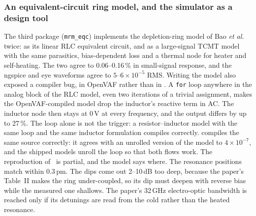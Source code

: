 \subsubsection{An equivalent-circuit ring model, and the simulator as a design tool}
The third package (\texttt{mrm\_eqc}) implements the depletion-ring model of Bao
\emph{et al.}~\cite{bao2024mrm} twice: as its linear RLC equivalent circuit, and as a
large-signal TCMT model with the same parasitics, bias-dependent loss and a thermal node for
heater and self-heating. The two agree to 0.06--0.16\,\% in small-signal response, and the
ngspice and \vas{} eye waveforms agree to $5$--$6\times10^{-5}$ RMS.
Writing the model also exposed a compiler bug, in OpenVAF rather than in \vas{}. A \texttt{for}
loop anywhere in the analog block of the RLC model, even two iterations of a trivial
assignment, makes the OpenVAF-compiled model drop the inductor's reactive term in AC. The
inductor node then stays at 0\,V at every frequency, and the output differs by up to 27\,\%.
The loop alone is not the trigger: a resistor--inductor model with the same loop and the same
inductor formulation compiles correctly.
\vas{} compiles the same source correctly: it agrees with an unrolled version of the model to
$4\times10^{-7}$, and the shipped models unroll the loop so that both flows work.
The reproduction of~\cite{bao2024mrm} is partial, and the model says where. The resonance
positions match within 0.3\,pm. The dips come out 2--10\,dB too deep, because the paper's
Table~II makes the ring under-coupled, so its dip must deepen with reverse bias while the
measured one shallows. The paper's 32\,GHz electro-optic bandwidth is reached only if its
detunings are read from the cold rather than the heated resonance.

